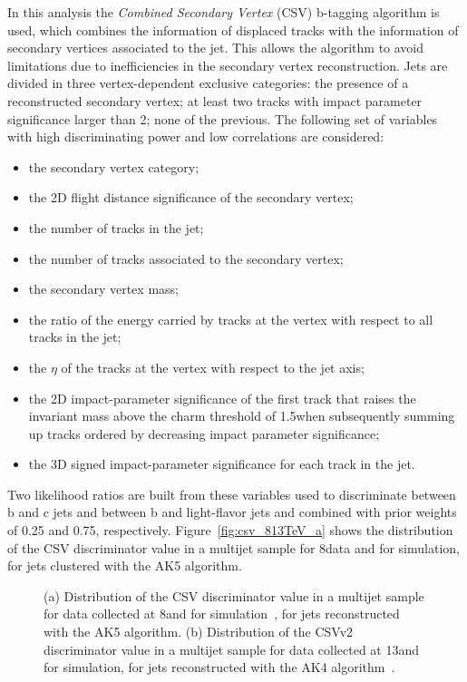 In this analysis the \textit{Combined Secondary Vertex} (CSV) b-tagging algorithm is used, which combines the information of displaced tracks with the information of secondary vertices associated to the jet.
This allows the algorithm to avoid limitations due to inefficiencies in the secondary vertex reconstruction. Jets are divided in three vertex-dependent exclusive categories: the presence of a reconstructed secondary vertex; at least two tracks with impact parameter significance larger than 2; none of the previous. The following set of variables with high discriminating power and low correlations are considered:

\begin{itemize}
\item the secondary vertex category;
\item the 2D flight distance significance of the secondary vertex;
\item the number of tracks in the jet;
\item the number of tracks associated to the secondary vertex;
\item the secondary vertex mass;
\item the ratio of the energy carried by tracks at the vertex with respect to all tracks in the jet;
\item the $\eta$ of the tracks at the vertex with respect to the jet axis;
\item the 2D impact-parameter significance of the first track that raises the invariant mass above the charm threshold of 1.5\GeV when subsequently summing up tracks ordered by decreasing impact parameter significance;
\item the 3D signed impact-parameter significance for each track in the jet.
\end{itemize}

Two likelihood ratios are built from these variables used to discriminate between b and c jets and between b and light-flavor jets and combined with prior weights of 0.25 and 0.75, respectively. Figure~\ref{fig:csv_813TeV_a} shows the distribution of the CSV discriminator value in a multijet sample for 8\TeV data and for simulation, for jets clustered with the AK5 algorithm.

\begin{figure}[!htb]
\begin{center}
\end{center} 
\caption{(a) Distribution of the CSV discriminator value in a multijet sample for data collected at 8\TeV and for simulation~\cite{CMS:BTV13001}, for jets reconstructed with the AK5 algorithm. (b) Distribution of the CSVv2 discriminator value in a multijet sample for data collected at 13\TeV and for simulation, for jets reconstructed with the AK4 algorithm~\cite{CMS-PAS-BTV-15-001}.}
\label{fig:csv_813TeV}
\end{figure}


